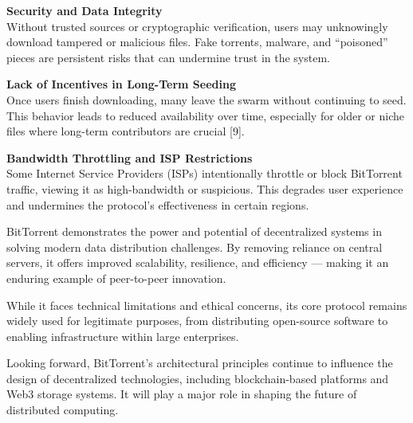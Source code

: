 \documentclass[landscape]{a0poster}
\begin{document}
\begin{multicols*}{3}
\vspace{1em}

\textbf{Security and Data Integrity} \\
Without trusted sources or cryptographic verification, users may unknowingly  download tampered or malicious files. Fake torrents, malware, and “poisoned” pieces are persistent  risks that can undermine trust in the system.

\vspace{1em}

\textbf{Lack of Incentives in Long-Term Seeding} \\
Once users finish downloading, many leave the swarm without  continuing to seed. This behavior leads to reduced availability over time, especially for older or niche files where long-term  contributors are crucial [9].

\vspace{1em}

\textbf{Bandwidth Throttling and ISP Restrictions} \\
Some Internet Service Providers (ISPs) intentionally throttle or  block BitTorrent traffic, viewing it as high-bandwidth or suspicious. This degrades user experience and undermines  the protocol’s effectiveness in certain regions.

BitTorrent demonstrates the power and potential  of decentralized systems in solving modern data distribution challenges. By removing reliance on central servers, it offers  improved scalability, resilience, and efficiency — making it an enduring example of  peer-to-peer innovation.

While it faces  technical limitations and ethical concerns, its core protocol remains widely  used for legitimate purposes, from distributing open-source software to enabling  infrastructure within large enterprises.

Looking forward, BitTorrent’s architectural  principles continue to influence the design of decentralized technologies, including blockchain-based  platforms and Web3 storage systems. It will play a major role in  shaping the future of distributed computing.

\nocite{*}
\footnotesize




\end{multicols*}
\end{document}
